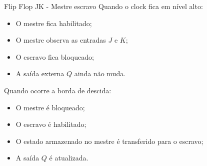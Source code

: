
\begin{frame}{Flip Flop JK - Mestre escravo}
    Quando o clock fica em nível alto:
    \begin{itemize}
        \item O mestre fica habilitado;
        \item O mestre observa as entradas \(J\) e \(K\);
        \item O escravo fica bloqueado;
        \item A saída externa \(Q\) ainda não muda.
    \end{itemize}
    Quando ocorre a borda de descida:
    \begin{itemize}
        \item O mestre é bloqueado;
        \item O escravo é habilitado;
        \item O estado armazenado no mestre é transferido para o escravo;
        \item A saída \(Q\) é atualizada.
    \end{itemize}
\end{frame}